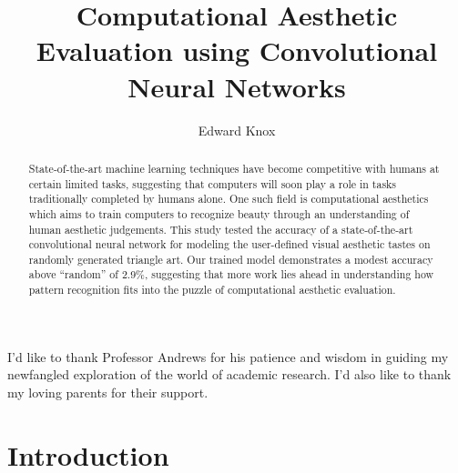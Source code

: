 \documentclass[midd]{thesis}
\title {Computational Aesthetic Evaluation using Convolutional Neural Networks}
\author {Edward Knox}
\begin{document}
\maketitle









\begin{abstract}
State-of-the-art machine learning techniques have become competitive with humans at certain limited tasks, suggesting that computers will soon play a role in tasks traditionally completed by humans alone. One such field is computational aesthetics which aims to train computers to recognize beauty through an understanding of human aesthetic judgements. This study tested the accuracy of a state-of-the-art convolutional neural network for modeling the user-defined visual aesthetic tastes on randomly generated triangle art. Our trained model demonstrates a modest accuracy above ``random'' of 2.9\%, suggesting that more work lies ahead in understanding how pattern recognition fits into the puzzle of computational aesthetic evaluation.
\end{abstract}

\begin{acknowledgements}
I'd like to thank Professor Andrews for his patience and wisdom in guiding my newfangled exploration of the world of academic research. I'd also like to thank my loving parents for their support.
\end{acknowledgements}

\contentspage
\tablelistpage
\figurelistpage

\normalspacing \setcounter{page}{1} 
















\chapter{Introduction}
\label{sec:intro}


\end{document}
